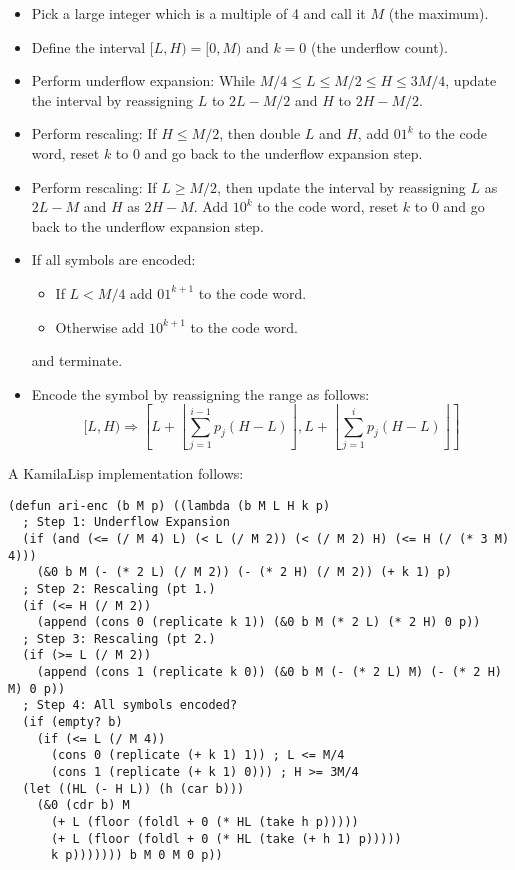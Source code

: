 \begin{itemize}
  \item Pick a large integer which is a multiple of 4 and call it $M$ (the maximum).
  \item Define the interval $[L, H) = [0, M)$ and $k=0$ (the underflow count).
  \item Perform underflow expansion: While $M/4 \leq L \leq M/2 \leq H \leq 3M/4$, update the interval by reassigning $L$ to $2L-M/2$ and $H$ to $2H-M/2$.
  \item Perform rescaling: If $H \le M/2$, then double $L$ and $H$, add $01^k$ to the code word, reset $k$ to 0 and go back to the underflow expansion step.
  \item Perform rescaling: If $L \ge M/2$, then update the interval by reassigning $L$ as $2L-M$ and $H$ as $2H-M$. Add $10^k$ to the code word, reset $k$ to 0 and go back to the underflow expansion step.
  \item If all symbols are encoded:
  \begin{itemize}
    \item If $L < M/4$ add $01^{k+1}$ to the code word.
    \item Otherwise add $10^{k+1}$ to the code word.
  \end{itemize}
  and terminate.
  \item Encode the symbol by reassigning the range as follows:
  $$
  [L, H) \Rightarrow \left[L+\left\lfloor\sum_{j=1}^{i-1} p_j(H-L)\right\rfloor, L+\left\lfloor\sum_{j=1}^{i} p_j(H-L)\right\rfloor\right]
  $$
\end{itemize}

A KamilaLisp implementation follows:

\begin{Verbatim}
(defun ari-enc (b M p) ((lambda (b M L H k p)
  ; Step 1: Underflow Expansion
  (if (and (<= (/ M 4) L) (< L (/ M 2)) (< (/ M 2) H) (<= H (/ (* 3 M) 4)))
    (&0 b M (- (* 2 L) (/ M 2)) (- (* 2 H) (/ M 2)) (+ k 1) p)
  ; Step 2: Rescaling (pt 1.)
  (if (<= H (/ M 2))
    (append (cons 0 (replicate k 1)) (&0 b M (* 2 L) (* 2 H) 0 p))
  ; Step 3: Rescaling (pt 2.)
  (if (>= L (/ M 2))
    (append (cons 1 (replicate k 0)) (&0 b M (- (* 2 L) M) (- (* 2 H) M) 0 p))
  ; Step 4: All symbols encoded?
  (if (empty? b)
    (if (<= L (/ M 4))
      (cons 0 (replicate (+ k 1) 1)) ; L <= M/4
      (cons 1 (replicate (+ k 1) 0))) ; H >= 3M/4
  (let ((HL (- H L)) (h (car b)))
    (&0 (cdr b) M
      (+ L (floor (foldl + 0 (* HL (take h p)))))
      (+ L (floor (foldl + 0 (* HL (take (+ h 1) p)))))
      k p))))))) b M 0 M 0 p))
\end{Verbatim}